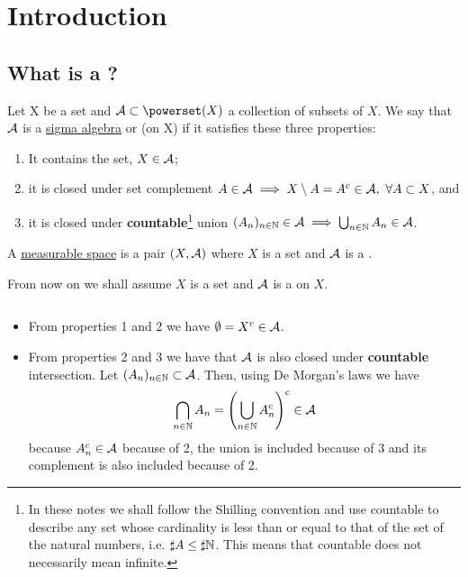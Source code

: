 
\chapter{Introduction}

\section{What is a \siga?}

\begin{dfn}
	Let X be a set and $\sa \subset \powerset(X)$ a collection of subsets of $X$. We say that $\mathcal{A}$ is a \underline{sigma algebra} or \siga (on X) if it satisfies these three properties:
	\begin{enumerate}
		\item It contains the set, $X \in \mathcal{A}$;
		\item it is closed under set complement $A \in \mathcal{A} \implies X \setminus A = A^c \in \mathcal{A},\ \forall A \subset X$, and
		\item it is closed under \textbf{countable}\footnote{In these notes we shall follow the Shilling convention and use countable to describe any set whose cardinality is less than or equal to that of the set of the natural numbers, i.e. $\sharp A \leq \sharp \mathbb{N}$. This means that countable does not necessarily mean infinite.} union $(A_n)_{n \in \mathbb{N}} \in \mathcal{A} \implies \bigcup_{n \in \mathbb{N}} A_n \in \mathcal{A}$.
	\end{enumerate}
\end{dfn}

\begin{dfn}
	A \underline{measurable space} is a pair $(X, \mathcal{A})$ where $X$ is a set and $\mathcal{A}$ is a \siga.
\end{dfn}

From now on we shall assume $X$ is a set and $\mathcal{A}$ is a \siga on $X$.

\begin{remark}$ $ \newline
	\begin{itemize}
		\item From properties 1 and 2 we have $\emptyset = X^c\in \mathcal{A}$.
		\item From properties 2 and 3 we have that $\mathcal{A}$ is also closed under \textbf{countable} intersection. Let $(A_n)_{n \in \mathbb{N}} \subset \mathcal{A}$. Then, using De Morgan's laws we have
		\begin{align*}
			\bigcap_{n \in \mathbb{N}} A_n = \left(\bigcup_{n \in \mathbb{N}} A_n^c\right)^c \in \mathcal{A}
		\end{align*}
		because $A_n^c \in \mathcal{A}$ because of 2, the union is included because of 3 and its complement is also included because of 2.
	\end{itemize}
\end{remark}

